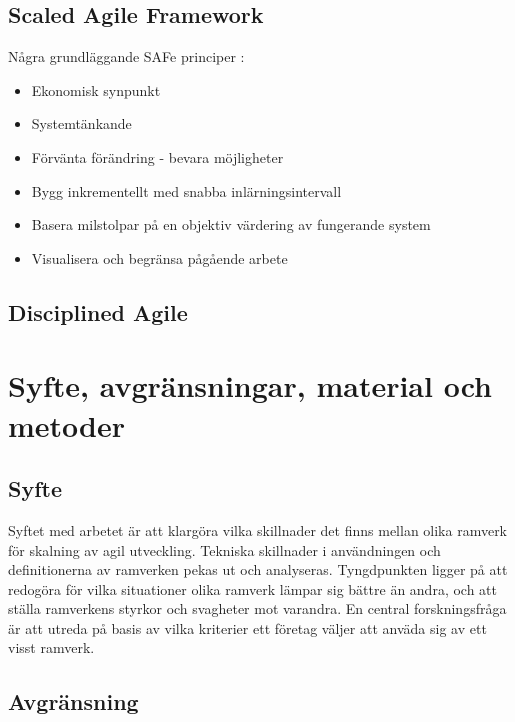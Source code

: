 	\subsection{Scaled Agile Framework}
	
	
	Några grundläggande SAFe principer \cite{safe_principles}:
	\begin{itemize}
		\item Ekonomisk synpunkt
		\item Systemtänkande
		\item Förvänta förändring - bevara möjligheter
		\item Bygg inkrementellt med snabba inlärningsintervall
		\item Basera milstolpar på en objektiv värdering av fungerande system
		\item Visualisera och begränsa pågående arbete
	\end{itemize}
	
	
	\subsection{Disciplined Agile}
	
	
		
	\newpage
\section{Syfte, avgränsningar, material och metoder}
	
	
	\subsection{Syfte}
	
	Syftet med arbetet är att klargöra vilka skillnader det finns mellan olika ramverk för skalning av agil utveckling. Tekniska skillnader i användningen och definitionerna av ramverken pekas ut och analyseras.
	Tyngdpunkten ligger på att redogöra för vilka situationer olika ramverk lämpar sig bättre än andra, och att ställa ramverkens styrkor och svagheter mot varandra. \newline
	En central forskningsfråga är att utreda på basis av vilka kriterier ett företag väljer att anväda sig av ett visst ramverk.
	
	
	
	
	\subsection{Avgränsning}
	

